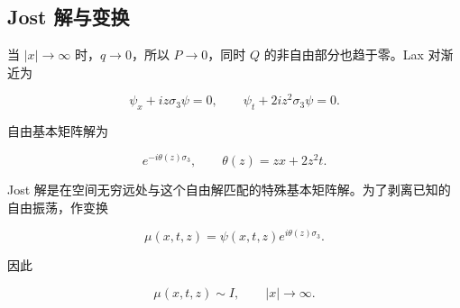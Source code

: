 \documentclass[
    lang=cn,
    scheme=chinese,
    mode=simple,
    device=normal,
    color=blue,
    math=cm,
    thmcnt=section,
    12pt,
    nowatermark
]{elegantbook}
\begin{document}



\subsection{Jost 解与变换}

当 $\lvert x\rvert\to\infty$ 时，$q\to0$，所以 $P\to0$，同时 $Q$ 的非自由部分也趋于零。Lax 对渐近为

\[
    \psi_x+iz\sigma_3\psi=0,\qquad
    \psi_t+2iz^2\sigma_3\psi=0.
\]

自由基本矩阵解为

\[
    e^{-i\theta(z)\sigma_3},
    \qquad
    \theta(z)=zx+2z^2t.
\]

Jost 解是在空间无穷远处与这个自由解匹配的特殊基本矩阵解。为了剥离已知的自由振荡，作变换

\begin{equation}
    \mu(x,t,z)=\psi(x,t,z)e^{i\theta(z)\sigma_3}.
    \tag{5.1.5}
    \label{eq:5.1.5}
\end{equation}

因此

\begin{equation}
    \mu(x,t,z)\sim I,\qquad \lvert x\rvert\to\infty.
    \tag{5.1.6}
    \label{eq:5.1.6}
\end{equation}
\end{document}
